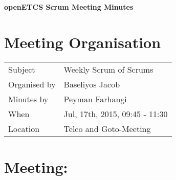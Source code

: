 \documentclass[a4paper, 11pt]{article}
\begin{document}
{\begin{center}\huge\bf openETCS Scrum Meeting Minutes\end{center}}
\section{Meeting Organisation}

\renewcommand{\arraystretch}{1.5}
\begin{supertabular}{m{.2\textwidth}m{.8\textwidth}}
Subject & Weekly Scrum of Scrums\\
Organised by & Baseliyos Jacob\\
Minutes by & Peyman Farhangi\\
When & Jul, 17th, 2015, 09:45 - 11:30\\
Location & Telco and Goto-Meeting\\
\end{supertabular}

\renewcommand{\arraystretch}{1.0}
\section{Meeting:}
\end{document}
